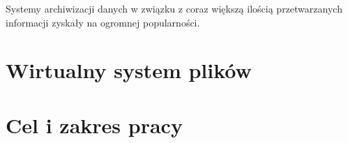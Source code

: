 Systemy archiwizacji danych w związku z coraz większą ilością przetwarzanych informacji zyskały na ogromnej popularności. 
\section{Wirtualny system plików}
\section{Cel i zakres pracy}